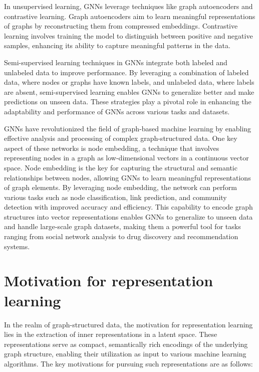 In unsupervised learning, GNNs leverage techniques like graph autoencoders and contrastive learning. Graph autoencoders aim to learn meaningful representations of graphs by reconstructing them from compressed embeddings. Contrastive learning involves training the model to distinguish between positive and negative samples, enhancing its ability to capture meaningful patterns in the data.

Semi-supervised learning techniques in GNNs integrate both labeled and unlabeled data to improve performance. By leveraging a combination of labeled data, where nodes or graphs have known labels, and unlabeled data, where labels are absent, semi-supervised learning enables GNNs to generalize better and make predictions on unseen data. \cite{DBLP:journals/corr/KipfW16} These strategies play a pivotal role in enhancing the adaptability and performance of GNNs across various tasks and datasets.

GNNs have revolutionized the field of graph-based machine learning by enabling effective analysis and processing of complex graph-structured data. One key aspect of these networks is node embedding, a technique that involves representing nodes in a graph as low-dimensional vectors in a continuous vector space. Node embedding is the key for capturing the structural and semantic relationships between nodes, allowing GNNs to learn meaningful representations of graph elements. By leveraging node embedding, the network can perform various tasks such as node classification, link prediction, and community detection with improved accuracy and efficiency. This capability to encode graph structures into vector representations enables GNNs to generalize to unseen data and handle large-scale graph datasets, making them a powerful tool for tasks ranging from social network analysis to drug discovery and recommendation systems.


\section{Motivation for representation learning}

In the realm of graph-structured data, the motivation for representation learning lies in the extraction of inner representations in a latent space. These representations serve as compact, semantically rich encodings of the underlying graph structure, enabling their utilization as input to various machine learning algorithms. The key motivations for pursuing such representations are as follows: \cite{DBLP:journals/corr/abs-1709-05584}


